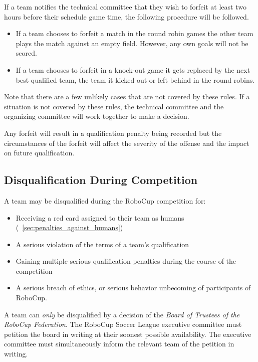 If a team notifies the technical committee that they wish to forfeit at least two hours before their schedule game time, the following procedure will be followed.
\begin{itemize}
  \item If a team chooses to forfeit a match in the round robin games the other team plays the match against an empty field.
    However, any own goals will not be scored.
  \item If a team chooses to forfeit in a knock-out game it gets replaced by the next best qualified team, \ie the team it kicked out or left behind in the round robins.
\end{itemize}

Note that there are a few unlikely cases that are not covered by these rules.
If a situation is not covered by these rules, the technical committee and the organizing committee will work together to make a decision.

Any forfeit will result in a qualification penalty being recorded but the circumstances of the forfeit will affect the severity of the offense and the impact on future qualification.

\subsection{Disqualification During Competition}
\label{sec:disqualification_during_competition}

A team may be disqualified during the RoboCup competition for:
\begin{itemize}
  \item Receiving a red card assigned to their team as humans (\cf~\cref{sec:penalties_against_humans})
  \item A serious violation of the terms of a team's qualification
  \item Gaining multiple serious qualification penalties during the course of the competition
  \item A serious breach of ethics, or serious behavior unbecoming of participants of RoboCup.
\end{itemize}

A team can \textit{only} be disqualified by a decision of the \textit{Board of Trustees of the RoboCup Federation}.
The RoboCup Soccer League executive committee must petition the board in writing at their soonest possible availability.
The executive committee must simultaneously inform the relevant team of the petition in writing.

